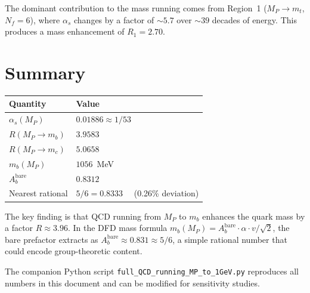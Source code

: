 \documentclass[11pt]{article}
\begin{document}
The dominant contribution to the mass running comes from Region~1 ($M_P \to m_t$, $N_f = 6$), where $\alpha_s$ changes by a factor of $\sim 5.7$ over $\sim 39$ decades of energy. This produces a mass enhancement of $R_1 = 2.70$.

\section{Summary}

\begin{center}
\renewcommand{\arraystretch}{1.3}
\begin{tabular}{ll}
\toprule
Quantity & Value \\
\midrule
$\alpha_s(M_P)$ & $0.01886 \approx 1/53$ \\
$R(M_P \to m_b)$ & $3.9583$ \\
$R(M_P \to m_c)$ & $5.0658$ \\
$m_b(M_P)$ & $1056$~MeV \\
$A_b^{\mathrm{bare}}$ & $0.8312$ \\
Nearest rational & $5/6 = 0.8333$ ~~(0.26\% deviation) \\
\bottomrule
\end{tabular}
\end{center}

The key finding is that QCD running from $M_P$ to $m_b$ enhances the quark mass by a factor $R \approx 3.96$. In the DFD mass formula $m_b(M_P) = A_b^{\mathrm{bare}} \cdot \alpha \cdot v/\sqrt{2}$, the bare prefactor extracts as $A_b^{\mathrm{bare}} \approx 0.831 \approx 5/6$, a simple rational number that could encode group-theoretic content.

The companion Python script \texttt{full\_QCD\_running\_MP\_to\_1GeV.py} reproduces all numbers in this document and can be modified for sensitivity studies.
\end{document}
